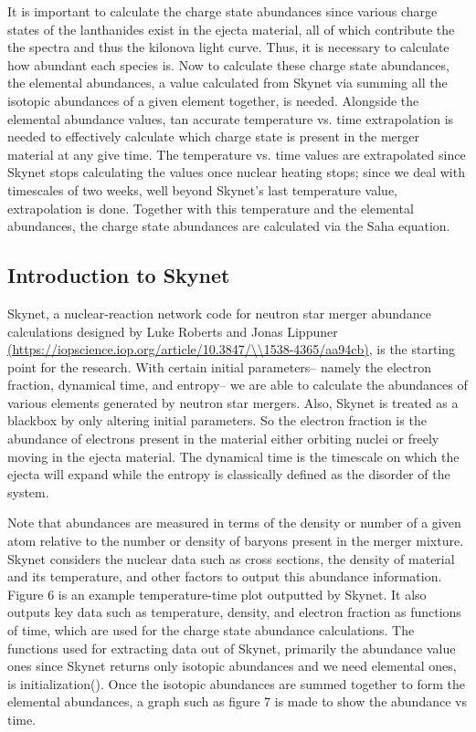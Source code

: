 \documentclass[11pt,a4paper]{article}
\begin{document}
\hspace{8mm} It is important to calculate the charge state abundances since various charge states of the lanthanides exist in the ejecta material, all of which contribute the the spectra and thus the kilonova light curve. Thus, it is necessary to calculate how abundant each species is. Now to calculate these charge state abundances, the elemental abundances, a value calculated from Skynet via summing all the isotopic abundances of a given element together, is needed. Alongside the elemental abundance values, tan accurate temperature vs. time extrapolation is needed to effectively calculate which charge state is present in the merger material at any give time. The temperature vs. time values are extrapolated since Skynet stops calculating the values once nuclear heating stops; since we deal with timescales of two weeks, well beyond Skynet's last temperature value, extrapolation is done. Together with this temperature and the elemental abundances, the charge state abundances are calculated via the Saha equation. 

\subsection{Introduction to Skynet}

\hspace{8mm} Skynet, a nuclear-reaction network code for neutron star merger abundance calculations designed by Luke Roberts and Jonas Lippuner \url{(https://iopscience.iop.org/article/10.3847/\\1538-4365/aa94cb)}, is the starting point for the research. With certain initial parameters-- namely the electron fraction, dynamical time, and entropy-- we are able to calculate the abundances of various elements generated by neutron star mergers. Also, Skynet is treated as a blackbox by only altering initial parameters. So the electron fraction is the abundance of electrons present in the material either orbiting nuclei or freely moving in the ejecta material. The dynamical time is the timescale on which the ejecta will expand while the entropy is classically defined as the disorder of the system.

Note that abundances are measured in terms of the density or number of a given atom relative to the number or density of baryons present in the merger mixture. Skynet considers the nuclear data such as cross sections, the density of material and its temperature, and other factors to output this abundance information. Figure 6 is an example temperature-time plot outputted by Skynet. It also outputs key data such as temperature, density, and electron fraction as functions of time, which are used for the charge state abundance calculations. The functions used for extracting data out of Skynet, primarily the abundance value ones since Skynet returns only isotopic abundances and we need elemental ones, is initialization(). Once the isotopic abundances are summed together to form the elemental abundances, a graph such as figure 7 is made to show the abundance vs time. 
\end{document}
